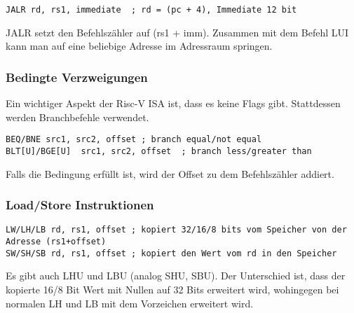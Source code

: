 \begin{lstlisting}
JALR rd, rs1, immediate  ; rd = (pc + 4), Immediate 12 bit
\end{lstlisting}

JALR setzt den Befehlszähler auf (rs1 + imm). Zusammen mit dem Befehl LUI kann
man auf eine beliebige Adresse im Adressraum springen.

\subsubsection{Bedingte Verzweigungen}

Ein wichtiger Aspekt der Risc-V ISA ist, dass es keine Flags gibt. Stattdessen
werden Branchbefehle verwendet.

\begin{lstlisting}
BEQ/BNE src1, src2, offset ; branch equal/not equal
BLT[U]/BGE[U]  src1, src2, offset  ; branch less/greater than
\end{lstlisting}

Falls die Bedingung erfüllt ist, wird der Offset zu dem Befehlszähler addiert.

\subsubsection{Load/Store Instruktionen}

\begin{lstlisting}
LW/LH/LB rd, rs1, offset ; kopiert 32/16/8 bits vom Speicher von der Adresse (rs1+offset)
SW/SH/SB rd, rs1, offset ; kopiert den Wert vom rd in den Speicher
\end{lstlisting}

Es gibt auch LHU und LBU (analog SHU, SBU). Der Unterschied ist, dass der
kopierte 16/8 Bit Wert mit Nullen auf 32 Bits erweitert wird, wohingegen bei normalen LH
und LB mit dem Vorzeichen erweitert wird.